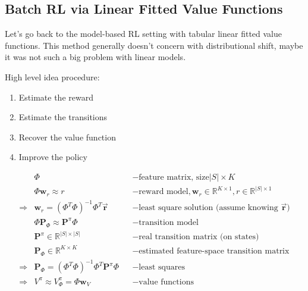 
\subsection{Batch RL via Linear Fitted Value Functions}
Let's go back to the model-based \ac{RL} setting with tabular linear fitted value functions. This method generally doesn't concern with distributional shift, maybe it was not such a big problem with linear models.

High level idea procedure:
\begin{enumerate}
	\item Estimate the reward
	\item Estimate the transitions
	\item Recover the value function
	\item Improve the policy
\end{enumerate}

\begin{align}
	&\Phi &&-\text{feature matrix, size} |S| \times K\\
	&\Phi \textbf{w}_r \approx r &&-\text{reward model}, \textbf{w}_r \in \mathbb{R}^{K\times 1}, r \in \mathbb{R}^{|S| \times 1}\\
	\Rightarrow & \textbf{w}_r = (\Phi^T \Phi)^{-1} \Phi^T \vec{\textbf{r}} &&-\text{least square solution (assume knowing $\vec{\textbf{r}}$)}\\
	&\Phi \textbf{P}_\Phi \approx \textbf{P}^\pi \Phi &&-\text{transition model}\\
	&\textbf{P}^\pi \in \mathbb{R}^{|S|\times|S|} &&-\text{real transition matrix (on states)}\\
	&\textbf{P}_\Phi \in \mathbb{R}^{K\times K} &&-\text{estimated feature-space transition matrix}\\
	\Rightarrow & \textbf{P}_\Phi = \left(\Phi^T \Phi\right)^{-1} \Phi^T \textbf{P}^\pi \Phi && -\text{least squares}\\
	\Rightarrow & V^\pi \approx V^\pi_\Phi = \Phi \textbf{w}_V &&-\text{value functions}
\end{align}

